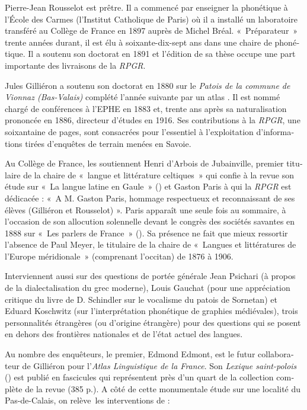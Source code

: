 \documentclass[french,output=paper,colorlinks,citecolor=brown]{../langscibook}
\begin{document}
\begin{otherlanguage}{french}
Pierre-Jean Rousselot est prêtre. Il a commencé par enseigner la phonétique à l’École des Carmes (l’Institut Catholique de Paris) où il a installé un laboratoire transféré au Collège de France en 1897 auprès de Michel Bréal. «~Préparateur~» trente années durant, il est élu à soixante-dix-sept ans dans une chaire de phonétique. Il a soutenu son doctorat en 1891 et l’édition de sa thèse occupe une part importante des livraisons de la \textit{RPGR}. 

Jules Gilliéron a soutenu son doctorat en 1880 sur le \textit{Patois de la commune de Vionnaz (Bas-Valais)} complété l’année suivante par un atlas \citep{Gilliéron1881}. Il est nommé chargé de conférences à l’EPHE en 1883 et, trente ans après sa naturalisation prononcée en 1886, directeur d’études en 1916. Ses contributions à la \textit{RPGR}, une soixantaine de pages, sont consacrées pour l’essentiel à l’exploitation d’informations tirées d’enquêtes de terrain menées en Savoie. 

Au Collège de France, les soutiennent Henri d’Arbois de Jubainville, premier titulaire de la chaire de «~langue et littérature celtiques~» qui confie à la revue son étude sur «~La langue latine en Gaule~» (\citeyear[161--171]{Arbois-de-Jubainville1887}) et Gaston Paris à qui la \textit{RPGR} est dédicacée : «~A M. Gaston Paris, hommage respectueux et reconnaissant de ses élèves (Gilliéron et Rousselot) ». Paris apparaît une seule fois au sommaire, à l’occasion de son allocution solennelle devant le congrès des sociétés savantes en 1888 sur «~Les parlers de France~» (\citeyear[161--175]{Paris1888}). Sa présence ne fait que mieux ressortir l’absence de Paul Meyer, le titulaire de la chaire de «~Langues et littératures de l’Europe méridionale~» (comprenant l’occitan) de 1876 à 1906.

Interviennent aussi sur des questions de portée générale Jean Psichari (à propos de la dialectalisation du grec moderne), Louis Gauchat (pour une appréciation critique du livre de D. Schindler sur le vocalisme du patois de Sornetan) et Eduard Koschwitz (sur l’interprétation phonétique de graphies médiévales), trois personnalités étrangères (ou d’origine étrangère) pour des questions qui se posent en dehors des frontières nationales et de l’état actuel des langues.

Au nombre des enquêteurs, le premier, Edmond Edmont, est le futur collaborateur de Gilliéron pour l’\textit{Atlas Linguistique de la France}. Son \textit{Lexique saint-polois} (\citeyear{Edmont1887, Edmont1897}) est publié en fascicules qui représentent près d’un quart de la collection complète de la revue (385 p.). A côté de cette monumentale étude sur une localité du Pas-de-Calais, on relève~les interventions de :


\end{otherlanguage}
\end{document}
